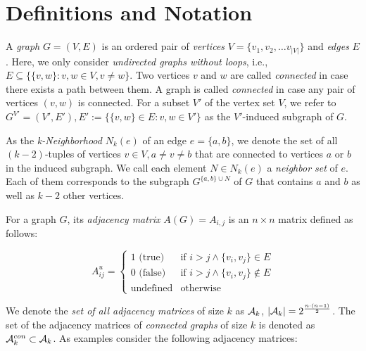 \documentclass{article}
\newcommand{\eqn}[1]{
	\begin{equation*}
		#1
	\end{equation*}
}
\begin{document}
\section{Definitions and Notation}


A \emph{graph} $G = (V,E)$ is an ordered pair of \emph{vertices} $V = \{v_1, v_2, \dots v_{|V|}\}$ and \emph{edges} $E$.
Here, we only consider \emph{undirected graphs without loops}, i.e., $E \subseteq \{\{v,w\}: v,w \in V, v \neq w\}$.
Two vertices $v$ and $w$ are called \emph{connected} in case there exists a path between them.
A graph is called \emph{connected} in case any pair of vertices $(v,w)$ is connected.
For a subset $V'$ of the vertex set $V$, we refer to $G^{V'} = (V', E'), E' := \{\{v,w\} \in E : v, w \in V'\}$ as the $V'$-induced subgraph of $G$.

As the \emph{k-Neighborhood} $N_k(e)$ of an edge $e = \{a,b\}$, we denote the set of all $(k-2)$-tuples of vertices $v \in V, a \neq v \neq b$ that are connected to vertices $a$ or $b$ in the induced subgraph.
We call each element $N \in N_k(e)$ a \emph{neighbor set} of $e$.
Each of them corresponds to the subgraph $G^{\{a,b\} \cup N}$ of $G$ that contains $a$ and $b$ as well as $k-2$ other vertices.

For a graph $G$, its \emph{adjacency matrix} $A(G) = A_{i,j}$ is an $n \times n$ matrix defined as follows:

\eqn{
A^u_{ij} =
	\left\{ \begin{array}{rl}
		1 \text{ (true)} & \text{if } i > j \land \{v_i,v_j\} \in E \\
		0 \text{ (false)} & \text{if } i > j \land \{v_i,v_j\} \notin E \\
		\text{undefined} & \text{otherwise}
	\end{array} \right.
}

We denote the \emph{set of all adjacency matrices} of size $k$ as ${\cal A}_k$, $|{\cal A}_k| = 2^{\frac{n \cdot (n-1)}{2}}$.
The set of the adjacency matrices of \emph{connected graphs} of size $k$ is denoted as ${\cal A}_k^{con} \subset {\cal A}_k$.
As examples consider the following adjacency matrices:
\end{document}
